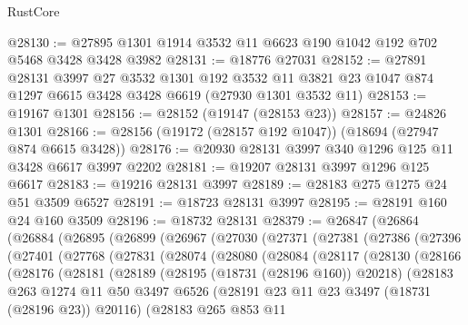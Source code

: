\begin{lexlean}{RustCore}
\begin{coremodule}
@28130 := @27895 @1301 @1914 @3532 @11 @6623 @190 @1042 @192 @702 @5468 @3428 @3428 @3982
@28131 := @18776 @27031
@28152 := @27891
    @28131
    @3997
    @27
    @3532
    @1301
    @192
    @3532
    @11
    @3821
    @23
    @1047
    @874
    @1297
    @6615
    @3428
    @3428
    @6619
    (@27930 @1301 @3532 @11)
@28153 := @19167 @1301
@28156 := @28152 (@19147 (@28153 @23))
@28157 := @24826 @1301
@28166 := @28156 (@19172 (@28157 @192 @1047)) (@18694 (@27947 @874 @6615 @3428))
@28176 := @20930 @28131 @3997 @340 @1296 @125 @11 @3428 @6617 @3997 @2202
@28181 := @19207 @28131 @3997 @1296 @125 @6617
@28183 := @19216 @28131 @3997
@28189 := @28183 @275 @1275 @24 @51 @3509 @6527
@28191 := @18723 @28131 @3997
@28195 := @28191 @160 @24 @160 @3509
@28196 := @18732 @28131
@28379 := @26847
    (@26864
      (@26884
        (@26895
          (@26899
            (@26967
              (@27030
                (@27371
                  (@27381
                    (@27386
                      (@27396
                        (@27401
                          (@27768
                            (@27831
                              (@28074
                                (@28080
                                  (@28084
                                    (@28117
                                      (@28130
                                        (@28166
                                          (@28176
                                            (@28181
                                              (@28189
                                                (@28195 (@18731 (@28196 @160)) @20218)
                                                (@28183
                                                  @263
                                                  @1274
                                                  @11
                                                  @50
                                                  @3497
                                                  @6526
                                                  (@28191
                                                    @23
                                                    @11
                                                    @23
                                                    @3497
                                                    (@18731 (@28196 @23))
                                                    @20116)
                                                  (@28183
                                                    @265
                                                    @853
                                                    @11

\end{coremodule}
\end{lexlean}
